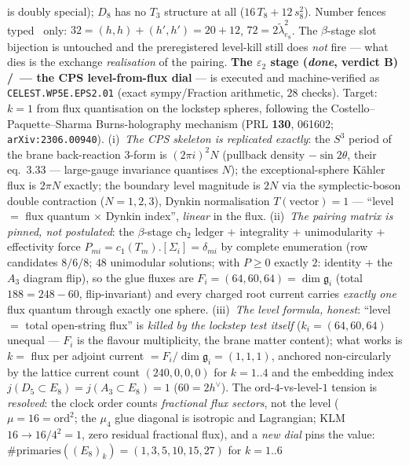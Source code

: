 is doubly special); $D_8$ has no $T_3$ structure at all ($16\,T_8{+}12\,s_8^2$). Number fences
typed \mC\ only: $32=(h,h){+}(h',h')=20{+}12$, $72=2\tilde\lambda^2_{e_8}$. The $\beta$-stage
slot bijection is untouched and the preregistered level-kill still does \emph{not} fire --- what
dies is the exchange \emph{realisation} of the pairing.
\textbf{The $\varepsilon_2$ stage (\emph{done}, verdict B) \mE/\mC\ --- the CPS level-from-flux
dial} --- is executed and machine-verified as \texttt{CELEST.WP5E.EPS2.01}
 (exact sympy/Fraction arithmetic, $28$
checks). Target: $k=1$ from flux quantisation on the lockstep spheres, following the
Costello--Paquette--Sharma Burns-holography mechanism (PRL \textbf{130}, 061602;
\texttt{arXiv:2306.00940}). (i)~\emph{The CPS skeleton is replicated exactly}: the $S^3$ period
of the brane back-reaction $3$-form is $(2\pi i)^2N$ (pullback density $-\sin2\theta$, their
eq.~3.33 --- large-gauge invariance quantises $N$); the exceptional-sphere K\"ahler flux is
$2\pi N$ exactly; the boundary level magnitude is $2N$ via the symplectic-boson double
contraction ($N=1,2,3$), Dynkin normalisation $T(\text{vector})=1$ --- ``level $=$ flux quantum
$\times$ Dynkin index'', \emph{linear} in the flux. (ii)~\emph{The pairing matrix is pinned, not
postulated}: the $\beta$-stage $\mathrm{ch}_2$ ledger $+$ integrality $+$ unimodularity $+$
effectivity force $P_{mi}=c_1(T_m).[\Sigma_i]=\delta_{mi}$ by complete enumeration (row
candidates $8/6/8$; $48$ unimodular solutions; with $P\ge0$ exactly $2$: identity $+$ the $A_3$
diagram flip), so the glue fluxes are $F_i=(64,60,64)=\dim\mathfrak g_i$ (total $188=248-60$,
flip-invariant) and every charged root current carries \emph{exactly one} flux quantum through
exactly one sphere. (iii)~\emph{The level formula, honest}: ``level $=$ total open-string flux''
is \emph{killed by the lockstep test itself} ($k_i=(64,60,64)$ unequal --- $F_i$ is the flavour
multiplicity, the brane matter content); what works is $k=$ flux per adjoint current
$=F_i/\dim\mathfrak g_i=(1,1,1)$, anchored non-circularly by the lattice current count
$(240,0,0,0)$ for $k=1..4$ and the embedding index $j(D_5{\subset}E_8)=j(A_3{\subset}E_8)=1$
($60=2h^\vee$). The ord-$4$-vs-level-$1$ tension is \emph{resolved}: the clock order counts
\emph{fractional flux sectors}, not the level ($\mu=16=\mathrm{ord}^2$; the $\mu_4$ glue diagonal
is isotropic and Lagrangian; KLM $16\to16/4^2=1$, zero residual fractional flux), and a
\emph{new dial} pins the value: $\#\mathrm{primaries}((E_8)_k)=(1,3,5,10,15,27)$ for $k=1..6$
